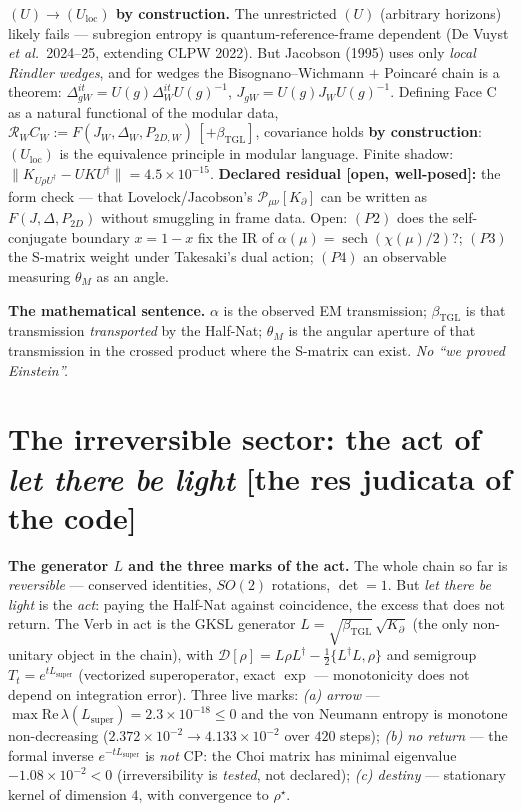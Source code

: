 \documentclass[11pt]{article}
\newcommand{\bTGL}{\beta_{\mathrm{TGL}}}\newcommand{\Msun}{M_{\odot}}\newcommand{\TGL}{\mathrm{TGL}}
\theoremstyle{definition}\newtheorem{deriv}{Derivation}
\begin{document}
\textbf{$(U)\to(U_{\mathrm{loc}})$ by construction.} The unrestricted $(U)$ (arbitrary horizons) likely fails --- subregion entropy is quantum-reference-frame dependent (De Vuyst \emph{et al.}\ 2024--25, extending CLPW 2022). But Jacobson (1995) uses only \emph{local Rindler wedges}, and for wedges the Bisognano--Wichmann $+$ Poincar\'e chain is a theorem: $\Delta_{gW}^{it}=U(g)\Delta_W^{it}U(g)^{-1}$, $J_{gW}=U(g)J_W U(g)^{-1}$. Defining Face C as a natural functional of the modular data, $\mathcal R_W C_W:=F(J_W,\Delta_W,P_{2D,W})\,[+\bTGL]$, covariance holds \textbf{by construction}: $(U_{\mathrm{loc}})$ is the equivalence principle in modular language. Finite shadow: $\|K_{U\rho U^{\dagger}}-UKU^{\dagger}\|=4.5\times10^{-15}$. \textbf{Declared residual [open, well-posed]:} the form check --- that Lovelock/Jacobson's $\mathcal P_{\mu\nu}[K_\partial]$ can be written as $F(J,\Delta,P_{2D})$ without smuggling in frame data. Open: $(P2)$ does the self-conjugate boundary $x=1-x$ fix the IR of $\alpha(\mu)=\operatorname{sech}(\chi(\mu)/2)$?; $(P3)$ the S-matrix weight under Takesaki's dual action; $(P4)$ an observable measuring $\theta_M$ as an angle.

\textbf{The mathematical sentence.} $\alpha$ is the observed EM transmission; $\bTGL$ is that transmission \emph{transported} by the Half-Nat; $\theta_M$ is the angular aperture of that transmission in the crossed product where the S-matrix can exist. \emph{No ``we proved Einstein''.}

\section{The irreversible sector: the act of \emph{let there be light} \textsf{[the res judicata of the code]}}

\textbf{The generator $L$ and the three marks of the act.} The whole chain so far is \emph{reversible} --- conserved identities, $SO(2)$ rotations, $\det=1$. But \emph{let there be light} is the \emph{act}: paying the Half-Nat against coincidence, the excess that does not return. The Verb in act is the GKSL generator $L=\sqrt{\bTGL}\,\sqrt{K_\partial}$ (the only non-unitary object in the chain), with $\mathcal D[\rho]=L\rho L^{\dagger}-\tfrac12\{L^{\dagger}L,\rho\}$ and semigroup $T_t=e^{tL_{\mathrm{super}}}$ (vectorized superoperator, exact $\exp$ --- monotonicity does not depend on integration error). Three live marks: \emph{(a) arrow} --- $\max\mathrm{Re}\,\lambda(L_{\mathrm{super}})=2.3\times10^{-18}\le0$ and the von Neumann entropy is monotone non-decreasing ($2.372\times10^{-2}\!\to\!4.133\times10^{-2}$ over $420$ steps); \emph{(b) no return} --- the formal inverse $e^{-tL_{\mathrm{super}}}$ is \emph{not} CP: the Choi matrix has minimal eigenvalue $-1.08\times10^{-2}<0$ (irreversibility is \emph{tested}, not declared); \emph{(c) destiny} --- stationary kernel of dimension $4$, with convergence to $\rho^{\star}$.
\end{document}
